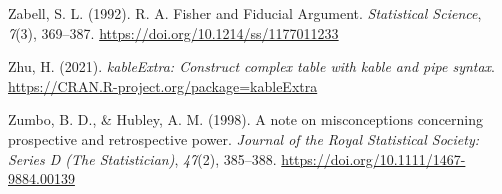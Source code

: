 \documentclass[
  oneside]{krantz}
\newlength{\cslhangindent}
\newlength{\cslentryspacingunit} %
\newenvironment{CSLReferences}[2] %
 {%
  \setlength{\parindent}{0pt}
  \ifodd #1
  \let\oldpar\par
  \def\par{\hangindent=\cslhangindent\oldpar}
  \fi
  \setlength{\parskip}{#2\cslentryspacingunit}
 }%
 {}
\begin{document}
\begin{CSLReferences}{1}{0}
\leavevmode{}%
Zabell, S. L. (1992). R. {A}. {Fisher} and {Fiducial Argument}.
\emph{Statistical Science}, \emph{7}(3), 369--387.
\url{https://doi.org/10.1214/ss/1177011233}

\leavevmode{}%
Zhu, H. (2021). \emph{kableExtra: Construct complex table with kable and
pipe syntax}. \url{https://CRAN.R-project.org/package=kableExtra}

\leavevmode{}%
Zumbo, B. D., \& Hubley, A. M. (1998). A note on misconceptions
concerning prospective and retrospective power. \emph{Journal of the
Royal Statistical Society: Series D (The Statistician)}, \emph{47}(2),
385--388. \url{https://doi.org/10.1111/1467-9884.00139}

\end{CSLReferences}
\end{document}
